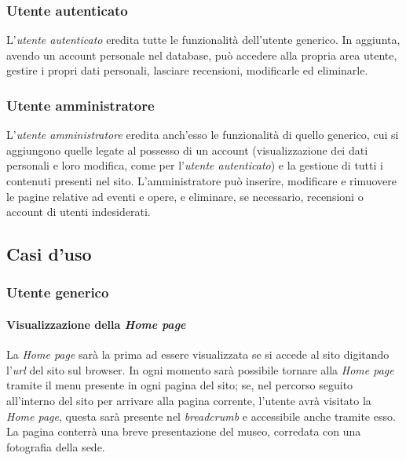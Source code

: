 \subsubsection{Utente autenticato}
\label{analisi-casi-uso-attori-principali-utente-autenticato}
L'\textit{utente autenticato} eredita tutte le funzionalità dell'utente generico. In aggiunta, avendo un account personale nel database, può accedere alla propria area utente, gestire i propri dati personali, lasciare recensioni, modificarle ed eliminarle.

\subsubsection{Utente amministratore}
\label{analisi-casi-uso-attori-principali-utente-amministratore}
L'\textit{utente amministratore} eredita anch'esso le funzionalità di quello generico, cui si aggiungono quelle legate al possesso di un account (visualizzazione dei dati personali e loro modifica, come per l'\textit{utente autenticato}) e  la gestione di tutti i contenuti presenti nel sito. L'amministratore può inserire, modificare e rimuovere le pagine relative ad eventi e opere, e eliminare, se necessario, recensioni o account di utenti indesiderati.


\subsection{Casi d'uso}
\label{analisi-casi-uso}

\subsubsection{Utente generico}
\label{analisi-casi-uso-attori-principali-utente-generico}

\paragraph{Visualizzazione della \textit{Home page}}
\label{analisi-casi-uso-attori-principali-utente-generico-1}
La \textit{Home page} sarà la prima ad essere visualizzata se si accede al sito digitando l'\textit{url} del sito sul browser. In ogni momento sarà possibile tornare alla \textit{Home page} tramite il menu presente in ogni pagina del sito; se, nel percorso seguito all'interno del sito per arrivare alla pagina corrente, l'utente avrà visitato la \textit{Home page}, questa sarà presente nel \textit{breadcrumb} e accessibile anche tramite esso. La pagina conterrà una breve presentazione del museo, corredata con una fotografia della sede.


